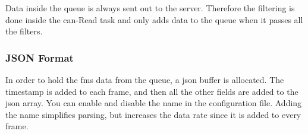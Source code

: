 Data inside the queue is always sent out to the server. Therefore the filtering is done inside the \acrshort{can}-Read task and only adds data to the queue when it passes all the filters.  

\subsubsection{JSON Format}
In order to hold the \acrshort{fms} data from the queue, a \acrshort{json} buffer is allocated. The timestamp is added to each frame, and then all the other fields are added to the \acrshort{json} array. You can enable and disable the name in the configuration file. Adding the name simplifies parsing, but increases the data rate since it is added to every frame.

\begin{table}[h!]
    \begin{center}
\end{center}
\end{table}
